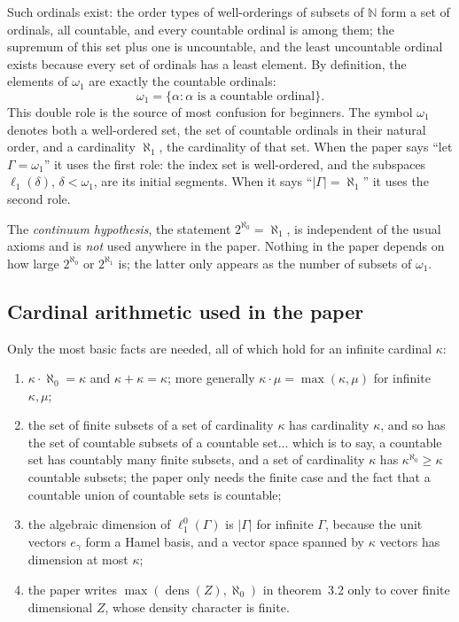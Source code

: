 \documentclass[12pt]{article}
\theoremstyle{definition}
\theoremstyle{remark}
\newcommand{\lo}[1]{\ell_1^0(#1)}
\newcommand{\ellone}[1]{\ell_1(#1)}
\newcommand{\NN}{\mathbb{N}}
\begin{document}
Such ordinals exist: the order types of well-orderings of subsets of $\NN$
form a set of ordinals, all countable, and every countable ordinal is among
them; the supremum of this set plus one is uncountable, and the least
uncountable ordinal exists because every set of ordinals has a least element.
By definition, the elements of $\omega_1$ are exactly the countable ordinals:
\[
\omega_1=\{\alpha:\alpha\text{ is a countable ordinal}\}.
\]
This double role is the source of most confusion for beginners. The symbol
$\omega_1$ denotes both a well-ordered set, the set of countable ordinals in
their natural order, and a cardinality $\aleph_1$, the cardinality of that
set. When the paper says ``let $\Gamma=\omega_1$'' it uses the first role: the
index set is well-ordered, and the subspaces $\ellone{\delta}$,
$\delta<\omega_1$, are its initial segments. When it says
``$|\Gamma|=\aleph_1$'' it uses the second role.

The \emph{continuum hypothesis}, the statement $2^{\aleph_0}=\aleph_1$, is
independent of the usual axioms and is \emph{not} used anywhere in the paper.
Nothing in the paper depends on how large $2^{\aleph_0}$ or $2^{\aleph_1}$
is; the latter only appears as the number of subsets of $\omega_1$.

\subsection{Cardinal arithmetic used in the paper}

Only the most basic facts are needed, all of which hold for an infinite
cardinal $\kappa$:
\begin{enumerate}[label = (\alph*)]
    \item $\kappa\cdot\aleph_0=\kappa$ and $\kappa+\kappa=\kappa$; more
          generally $\kappa\cdot\mu=\max(\kappa,\mu)$ for infinite $\kappa,\mu$;
    \item the set of finite subsets of a set of cardinality $\kappa$ has
          cardinality $\kappa$, and so has the set of countable subsets of a
          countable set... which is to say, a countable set has countably many
          finite subsets, and a set of cardinality $\kappa$ has
          $\kappa^{\aleph_0}\geq\kappa$ countable subsets; the paper only
          needs the finite case and the fact that a countable union of
          countable sets is countable;
    \item the algebraic dimension of $\lo{\Gamma}$ is $|\Gamma|$ for infinite
          $\Gamma$, because the unit vectors $e_\gamma$ form a Hamel basis,
          and a vector space spanned by $\kappa$ vectors has dimension at most
          $\kappa$;
    \item the paper writes $\max(\operatorname{dens}(Z),\aleph_0)$ in
          theorem~3.2 only to cover finite dimensional $Z$, whose density
          character is finite.
\end{enumerate}
\end{document}
